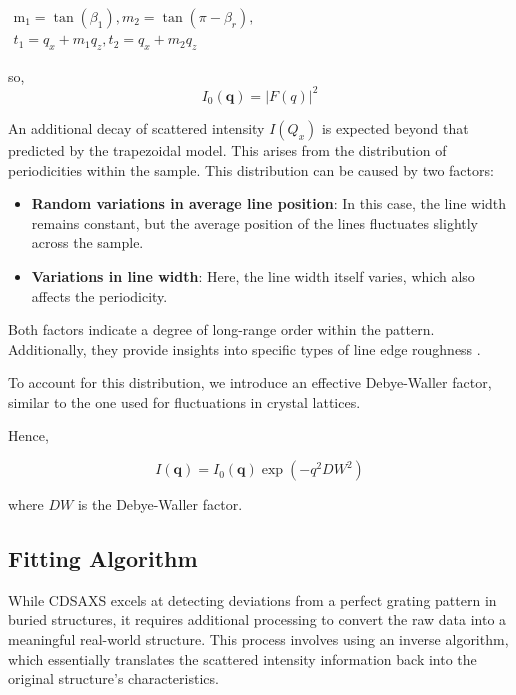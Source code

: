\( \begin{array}{l}\mathrm{m}_{1}=\tan \left(\beta_{1}\right) , m_{2}=\tan \left(\pi-\beta_{r}\right), \\ t_{1}= q_{x}+m_{1} q_{z}, t_{2}= q_{x}+m_{2} q_{z}\end{array} \)

\medskip

so,
\begin{equation}
    I_{0}(\mathbf{q}) = |F(q)|^{2}
\end{equation}

An additional decay of scattered intensity $I(Q_{x})$ is expected beyond that predicted by the trapezoidal model.
This arises from the distribution of periodicities within the sample. This distribution 
can be caused by two factors:
\begin{itemize}
    \item \textbf{Random variations in average line position}: In this case, the line width remains
         constant, but the average position of the lines fluctuates slightly across the 
         sample.
    \item \textbf{Variations in line width}: Here, the line width itself varies, 
        which also affects the periodicity.
\end{itemize}

Both factors indicate a degree of long-range order within the pattern. Additionally, they provide insights into specific types of line edge roughness \cite{these_reche}.

To account for this distribution, we introduce an effective Debye-Waller factor, similar to the one used for fluctuations in crystal lattices.

Hence,

\begin{equation}
    I(\mathbf{q}) = I_{0}(\mathbf{q}) \exp(-q^{2}DW^{2} )
\end{equation}

where $DW$ is the Debye-Waller factor.

\subsection{Fitting Algorithm}

While CDSAXS excels at detecting deviations from a perfect grating pattern in buried structures, it requires additional processing to convert the raw data into a meaningful real-world structure. This process involves using an inverse algorithm, which essentially translates the scattered intensity information back into the original structure's characteristics.

